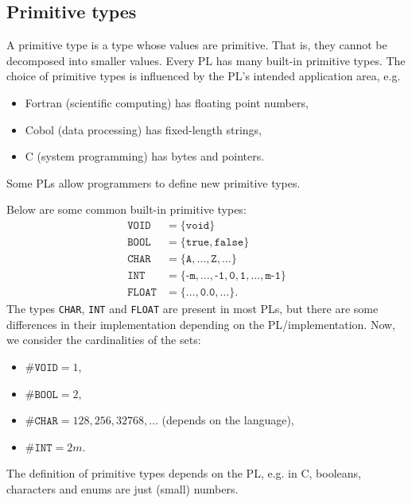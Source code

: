 \documentclass[a4paper, openany]{memoir}
\begin{document}
\subsection{Primitive types}
A primitive type is a type whose values are primitive. That is, they cannot be decomposed into smaller values. Every PL has many built-in primitive types. The choice of primitive types is influenced by the PL's intended application area, e.g.
\begin{itemize}
    \item Fortran (scientific computing) has floating point numbers,
    \item Cobol (data processing) has fixed-length strings,
    \item C (system programming) has bytes and pointers.
\end{itemize}
Some PLs allow programmers to define new primitive types.

Below are some common built-in primitive types:
\begin{align*}
    \texttt{VOID} &= \{\texttt{void}\} \\
    \texttt{BOOL} &= \{\texttt{true}, \texttt{false}\} \\
    \texttt{CHAR} &= \{\texttt{A}, \dots, \texttt{Z}, \dots \} \\
    \texttt{INT} &= \{\texttt{-m}, \dots, \texttt{-1}, \texttt{0}, \texttt{1}, \dots, \texttt{m-1}\} \\
    \texttt{FLOAT} &= \{\dots, \texttt{0.0}, \dots\}.
\end{align*}
The types \texttt{CHAR}, \texttt{INT} and \texttt{FLOAT} are present in most PLs, but there are some differences in their implementation depending on the PL/implementation. Now, we consider the cardinalities of the sets:
\begin{itemize}
    \item $\#\texttt{VOID} = 1$,
    \item $\#\texttt{BOOL} = 2$,
    \item $\#\texttt{CHAR} = 128, 256, 32768, \dots$ (depends on the language),
    \item $\#\texttt{INT} = 2m$.
\end{itemize}
The definition of primitive types depends on the PL, e.g. in C, booleans, characters and enums are just (small) numbers.
\end{document}
